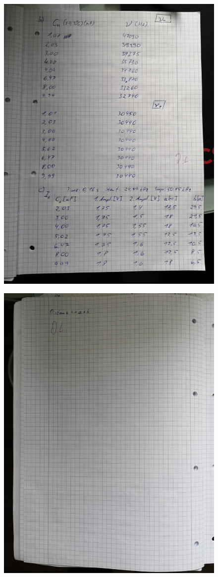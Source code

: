 \begin{figure}
    \centering
    \includegraphics[scale=0.23]{content/Bilder/IMG_20191215_141706.jpg}
\end{figure}
\newpage
\begin{figure}
    \centering
    \includegraphics[scale=0.23]{content/Bilder/IMG_20191215_141711.jpg}
\end{figure}